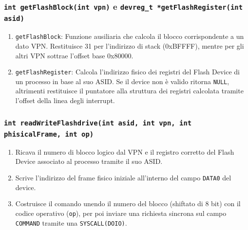 \documentclass[a4paper,12pt]{article}
\begin{document}
\subsubsection{\texttt{int getFlashBlock(int vpn)} e \texttt{devreg\_t *getFlashRegister(int asid)}}
\begin{enumerate}
    \item \texttt{getFlashBlock}: Funzione ausiliaria che calcola il blocco corrispondente a un dato VPN. Restituisce 31 per l'indirizzo di stack (0xBFFFF), mentre per gli altri VPN sottrae l'offset base 0x80000.
    \item \texttt{getFlashRegister}: Calcola l'indirizzo fisico dei registri del Flash Device di un processo in base al suo ASID. Se il device non è valido ritorna \texttt{NULL}, altrimenti restituisce il puntatore alla struttura dei registri calcolata tramite l'offset della linea degli interrupt.
\end{enumerate}

\subsubsection{\texttt{int readWriteFlashdrive(int asid, int vpn, int phisicalFrame, int op)}}
\begin{enumerate}
    \item Ricava il numero di blocco logico dal VPN e il registro corretto del Flash Device associato al processo tramite il suo ASID.
    \item Scrive l'indirizzo del frame fisico iniziale  all'interno del campo \texttt{DATA0} del device.
    \item Costruisce il comando unendo il numero del blocco (shiftato di 8 bit) con il codice operativo (\texttt{op}), per poi inviare una richiesta sincrona sul campo \texttt{COMMAND} tramite una \texttt{SYSCALL(DOIO)}.
\end{enumerate}
\end{document}
